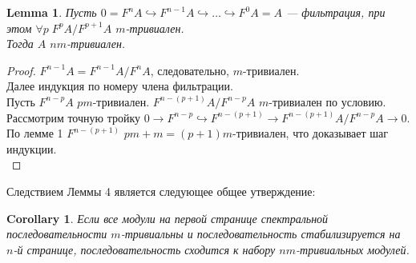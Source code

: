 \documentclass[a4paper, 12pt]{article}
\newtheorem{lemma}{Lemma}
\newtheorem{corollary}{Corollary}
\theoremstyle{definition}
\theoremstyle{remark}
\begin{document}
\begin{lemma}
  Пусть $0 = F^nA \hookrightarrow F^{n-1}A \hookrightarrow \ldots \hookrightarrow F^0A = A$ --- фильтрация, при этом $\forall p\; F^pA/F^{p+1}A$ $m$-тривиален.\\
  Тогда $A$ $nm$-тривиален.
\end{lemma}

\begin{proof}
  $F^{n-1}A = F^{n-1}A/F^nA$, следовательно, $m$-тривиален.\\
  Далее индукция по номеру члена фильтрации.\\
  Пусть $F^{n-p}A$ $pm$-тривиален. $F^{n-(p+1)}A/F^{n-p}A$ $m$-тривиален по условию. Рассмотрим точную тройку $0 \to F^{n-p} \hookrightarrow F^{n-(p+1)} \rightarrow F^{n-(p+1)}A/F^{n-p}A \to 0$. По лемме 1 $F^{n-(p+1)}$ $pm+m=(p+1)m$-тривиален, что доказывает шаг индукции.\\
\end{proof}

Следствием Леммы 4 является следующее общее утверждение:
\begin{corollary}
  Если все модули на первой странице спектральной последовательности $m$-тривиальны и последовательность стабилизируется на $n$-й странице, последовательность сходится к набору $nm$-тривиальных модулей.
\end{corollary}
\end{document}
